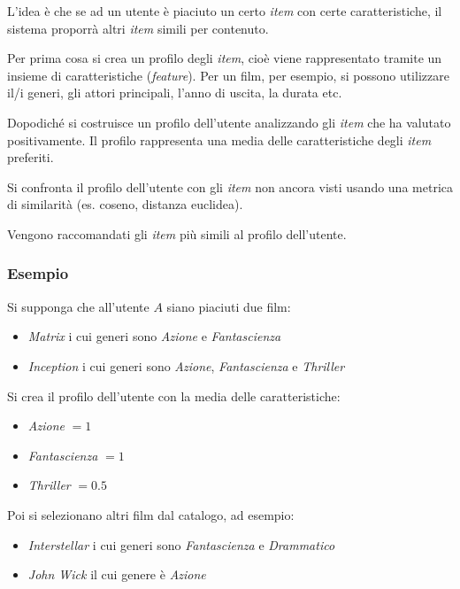 L'idea è che se ad un utente è piaciuto un certo \textit{item} con certe caratteristiche, il sistema proporrà altri \textit{item} simili per contenuto.

Per prima cosa si crea un profilo degli \textit{item}, cioè viene rappresentato tramite un insieme di caratteristiche (\textit{feature}). Per un film, per esempio, si possono utilizzare il/i generi, gli attori principali, l'anno di uscita, la durata etc.

Dopodiché si costruisce un profilo dell'utente analizzando gli \textit{item} che ha valutato positivamente. Il profilo rappresenta una media delle caratteristiche degli \textit{item} preferiti.

Si confronta il profilo dell'utente con gli \textit{item} non ancora visti usando una metrica di similarità (es. coseno, distanza euclidea).

Vengono raccomandati gli \textit{item} più simili al profilo dell'utente.

\subsubsection{Esempio}

Si supponga che all'utente $A$ siano piaciuti due film:

\begin{itemize}
    \item \textit{Matrix} i cui generi sono \textit{Azione} e \textit{Fantascienza}
    \item \textit{Inception} i cui generi sono \textit{Azione}, \textit{Fantascienza} e \textit{Thriller}
\end{itemize}

Si crea il profilo dell'utente con la media delle caratteristiche: 

\begin{itemize}
    \item \textit{Azione} $= 1$
    \item \textit{Fantascienza} $= 1$
    \item \textit{Thriller} $= 0.5$
\end{itemize}

Poi si selezionano altri film dal catalogo, ad esempio:

\begin{itemize}
    \item \textit{Interstellar} i cui generi sono \textit{Fantascienza} e \textit{Drammatico}
    \item \textit{John Wick} il cui genere è \textit{Azione}
\end{itemize}

